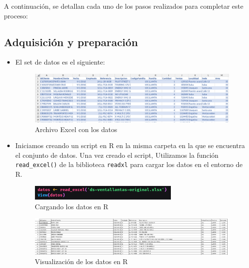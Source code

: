 \documentclass[12pt]{article}
\begin{document}
        A continuación, se detallan cada uno de los pasos realizados para completar este proceso:

        \subsection{Adquisición y preparación}
            
            \begin{itemize}
                \item El set de datos es el siguiente:
                    \begin{figure}[h]
                        \centering 
                        \includegraphics[width=1\textwidth]{img/limpieza-1.png}
                        \caption{Archivo Excel con los datos}
                \end{figure}

                \item Iniciamos creando un script en R en la misma carpeta en la que se encuentra el conjunto de datos. Una vez creado el script, Utilizamos la función \texttt{read\_excel()} de la biblioteca \texttt{readxl} para cargar los datos en el entorno de R.
                    \begin{figure}[h]
                        \centering 
                        \includegraphics[width=0.7\textwidth]{img/limpieza-2.png}
                        \caption{Cargando los datos en R}
                    \end{figure}

                    \newpage
                    \begin{figure}[h]
                        \centering 
                        \includegraphics[width=1\textwidth]{img/limpieza-3.png}
                        \caption{Visualización de los datos en R}
                    \end{figure}

            \end{itemize}
\end{document}
